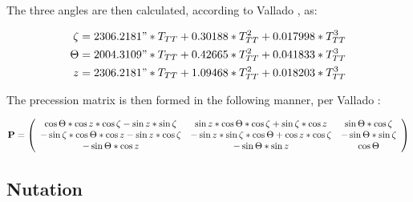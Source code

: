 The three angles are then calculated, according to Vallado \cite{ValladoThird},
as:

\begin{align}\label{precession_angles}
\zeta &= 2306.2181" * T_{TT} + 0.30188 * T^2_{TT} + 0.017998 * T^3_{TT} \\
 \Theta &= 2004.3109" * T_{TT} + 0.42665 * T^2_{TT} + 0.041833 * T^3_{TT} \\
 z &= 2306.2181" * T_{TT} + 1.09468 * T^2_{TT} + 0.018203 * T^3_{TT}
\end{align}


The precession matrix is then formed in the following manner, per
Vallado \cite{ValladoThird}:

\begin{equation}\label{precession_matrix}
{\bf P} =
\left( \begin{array} {ccc}

\cos \Theta *  \cos z *  \cos \zeta - \sin z * \sin  \zeta 
& \sin z * \cos \Theta * \cos \zeta + \sin \zeta * \cos z 
& \sin \Theta * \cos \zeta \\

-\sin \zeta * \cos \Theta * \cos z - \sin z * \cos \zeta 
& -\sin z * \sin \zeta * \cos \Theta + \cos z * \cos \zeta  
& -\sin \Theta * \sin \zeta \\

-\sin \Theta * \cos z 
& -\sin \Theta * \sin z 
& \cos \Theta 

\end{array} \right)
\end{equation}



\subsection{Nutation}   

